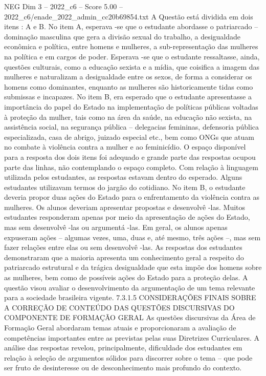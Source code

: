 \begin{textsample}{NEG Dim 3 – 2022\_c6 – Score 5.00 – 2022\_c6/enade\_2022\_admin\_cc20b69854.txt}
A Questão está dividida em dois itens : A e B.
No item A, esperava -se que o estudante abordasse o patriarcado – dominação masculina que gera a divisão sexual do trabalho, a desigualdade econômica e política, entre homens e mulheres, a sub-representação das mulheres na política e em cargos de poder.
Esperava -se que o estudante ressaltasse, ainda, questões culturais, como a educação sexista e a mídia, que coisifica a imagem das mulheres e naturalizam a desigualdade entre os sexos, de forma a considerar os homens como dominantes, enquanto as mulheres são historicamente tidas como submissas e incapazes.
No item B, era esperado que o estudante apresentasse a importância do papel do Estado na implementação de políticas públicas voltadas à proteção da mulher, tais como na área da saúde, na educação não sexista, na assistência social, na segurança pública – delegacias femininas, defensoria pública especializada, casa de abrigo, juizado especial etc., bem como ONGs que atuam no combate à violência contra a mulher e ao feminicídio.
O espaço disponível para a resposta dos dois itens foi adequado e grande parte das respostas ocupou parte das linhas, não contemplando o espaço completo.
Com relação à linguagem utilizada pelos estudantes, as respostas estavam dentro do esperado.
Alguns estudantes utilizavam termos do jargão do cotidiano.
No item B, o estudante deveria propor duas ações do Estado para o enfrentamento da violência contra as mulheres.
Os alunos deveriam apresentar propostas e desenvolvê -las.
Muitos estudantes responderam apenas por meio da apresentação de ações do Estado, mas sem desenvolvê -las ou argumentá -las.
Em geral, os alunos apenas expuseram ações – algumas vezes, uma, duas e, até mesmo, três ações –, mas sem fazer relações entre elas ou sem desenvolvê -las.
As respostas dos estudantes demonstraram que a maioria apresenta um conhecimento geral a respeito do patriarcado estrutural e da trágica desigualdade que esta impõe dos homens sobre as mulheres, bem como de possíveis ações do Estado para a proteção delas.
A questão visou avaliar o desenvolvimento da argumentação de um tema relevante para a sociedade brasileira vigente. 7.3.1.5 CONSIDERAÇÕES FINAIS SOBRE A CORREÇÃO DE CONTEÚDO DAS QUESTÕES DISCURSIVAS DO COMPONENTE DE FORMAÇÃO GERAL As questões discursivas da Área de Formação Geral abordaram temas atuais e proporcionaram a avaliação de competências importantes entre as previstas pelas suas Diretrizes Curriculares.
A análise das respostas revelou, principalmente, dificuldade dos estudantes em relação à seleção de argumentos sólidos para discorrer sobre o tema – que pode ser fruto de desinteresse ou de desconhecimento mais profundo do contexto.

\end{textsample}
